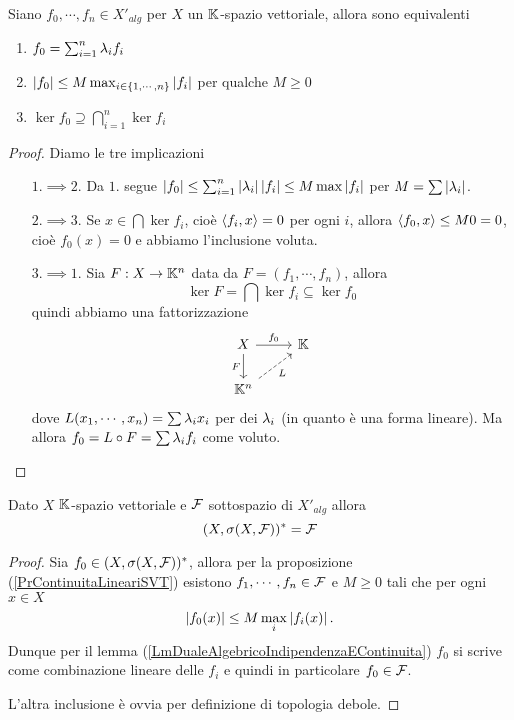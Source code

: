 \begin{lemma}[]\label{LmDualeAlgebricoIndipendenzaEContinuita}
Siano $f_0,\cdots,f_n\in X'_{alg}$ per $X$ un $\mathbb{K}$-spazio vettoriale, allora sono equivalenti
\begin{enumerate}
    \item $f_0=\sum_{i=1}^n\lambda_if_i$
    \item $\left|{f_0}\right|\leq M\max_{i\in\left\{{1,\cdots, n}\right\}}\left|{f_i}\right|$ per qualche $M\geq 0$
    \item $\ker f_0\supseteq \bigcap_{i=1}^n\ker f_i$
\end{enumerate}
\end{lemma}
\begin{proof}
    Diamo le tre implicazioni
    \setlength{\leftmargini}{0cm}
    \begin{itemize}
    \item[$\boxed{1.\implies2.}$] Da $1.$ segue $\left|{f_0}\right|\leq\sum_{i=1}^n\left|{\lambda_i}\right|\left|{f_i}\right|\leq M\max\left|{f_i}\right|$ per $M=\sum\left|{\lambda_i}\right|$.
    \item[$\boxed{2.\implies3.}$] Se $x\in \bigcap\ker f_i$, cio\`e $\left\langle {f_i,x}\right\rangle=0$ per ogni $i$, allora $\left\langle {f_0,x}\right\rangle\leq M0=0$, cio\`e $f_0(x)=0$ e abbiamo l'inclusione voluta.
    \item[$\boxed{3.\implies1.}$] Sia $F:X\to\mathbb{K}^n$ data da $F=(f_1,\cdots, f_n)$, allora
    \[\ker F=\bigcap\ker f_i\subseteq \ker f_0\]
    quindi abbiamo una fattorizzazione
\[\begin{tikzcd}
	X & \K \\
	{\K^n}
	\arrow["{f_0}", from=1-1, to=1-2]
	\arrow["F"', from=1-1, to=2-1]
	\arrow["L"', dashed, from=2-1, to=1-2]
\end{tikzcd}\]
    dove $L(x_1,\cdots, x_n)=\sum \lambda_i x_i$ per dei $\lambda_i$ (in quanto \`e una forma lineare). Ma allora $f_0=L\circ F=\sum \lambda_i f_i$ come voluto.
    \end{itemize}
    \setlength{\leftmargini}{0.5cm}
\end{proof}

\begin{proposition}\label{PrDualePerTopologiaDebole}
Dato $X$ $\mathbb{K}$-spazio vettoriale e $\mathcal{F}$ sottospazio di $X'_{alg}$ allora
\[(X,\sigma(X,\mathcal{F}))^\ast=\mathcal{F}\]
\end{proposition}
\begin{proof}
Sia $f_0\in (X,\sigma(X,\mathcal{F}))^\ast$, allora per la proposizione (\ref{PrContinuitaLineariSVT}) esistono $f_1,\cdots, f_n\in\mathcal{F}$ e $M\geq0$ tali che per ogni $x\in X$
\[\left|{f_0(x)}\right|\leq M\max_{i}\left|{f_i(x)}\right|.\]
Dunque per il lemma (\ref{LmDualeAlgebricoIndipendenzaEContinuita}) $f_0$ si scrive come combinazione lineare delle $f_i$ e quindi in particolare $f_0\in\mathcal{F}$.

L'altra inclusione \`e ovvia per definizione di topologia debole.
\end{proof}

